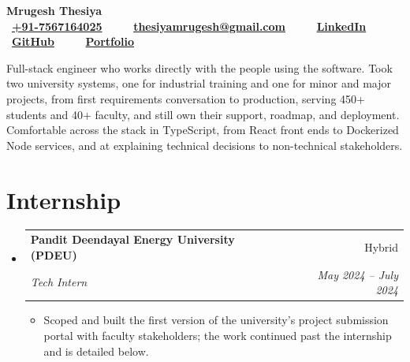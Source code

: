 \documentclass[a4paper,11pt]{article}
\makeatletter
\newcommand{\resumeSubheadingFull}[4]{
  \vspace{-1pt}\item
    \begin{tabular*}{0.97\textwidth}{l@{\extracolsep{\fill}}r}
    \textbf{#1} & #2 \\
    \textit{#3} & \textit{#4} \\
    \end{tabular*}\vspace{-5pt}
}
\newcommand{\resumeSubHeadingListStart}{\begin{itemize}[leftmargin=*]}
\newcommand{\resumeSubHeadingListEnd}{\end{itemize}}
\newcommand{\resumeItemListStart}{\begin{itemize}[itemsep=1pt,topsep=3pt]\small}
\newcommand{\resumeItemListEnd}{\end{itemize}\vspace{-3pt}}
\makeatother
\begin{document}
\begin{center}
    \vspace*{-14pt}
    {\fontsize{32}{36}\selectfont \textbf{Mrugesh Thesiya}}\\[7pt]
    {\small
    \faPhone ~\textbf{\href{tel:+917567164025}{+91-7567164025}}~~~~
    \faEnvelope ~\textbf{\href{mailto:thesiyamrugesh@gmail.com}{thesiyamrugesh@gmail.com}}~~~~
    \faLinkedin ~\textbf{\href{https://www.linkedin.com/in/mrugeshthesiya/}{LinkedIn}}~~~~
    \faGithub ~\textbf{\href{https://github.com/MrugeshThesiya}{GitHub}}~~~~
    \faGlobe ~\textbf{\href{https://mrugesh.pages.dev/}{Portfolio}}
    }
\end{center}

\small{Full-stack engineer who works directly with the people using the software. Took two university systems, one for industrial training and one for minor and major projects, from first requirements conversation to production, serving 450+ students and 40+ faculty, and still own their support, roadmap, and deployment. Comfortable across the stack in TypeScript, from React front ends to Dockerized Node services, and at explaining technical decisions to non-technical stakeholders.}

\section{Internship}
  \resumeSubHeadingListStart
    \resumeSubheadingFull{Pandit Deendayal Energy University (PDEU)}{Hybrid}
      {Tech Intern}{May 2024 -- July 2024}
      \resumeItemListStart
        \item Scoped and built the first version of the university's project submission portal with faculty stakeholders; the work continued past the internship and is detailed below.
      \resumeItemListEnd
  \resumeSubHeadingListEnd

\end{document}
